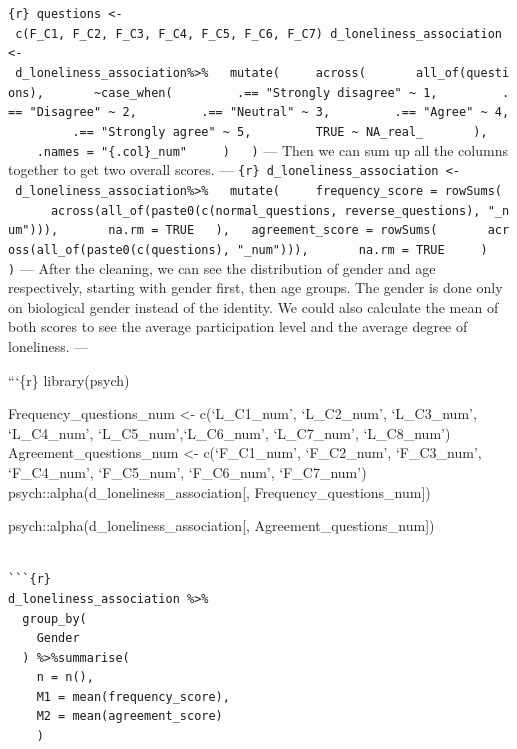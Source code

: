 \documentclass[
]{article}
\begin{document}
\texttt{\{r\}\ questions\ \textless{}-\ c(\textquotesingle{}F\_C1\textquotesingle{},\ \textquotesingle{}F\_C2\textquotesingle{},\ \textquotesingle{}F\_C3\textquotesingle{},\ \textquotesingle{}F\_C4\textquotesingle{},\ \textquotesingle{}F\_C5\textquotesingle{},\ \textquotesingle{}F\_C6\textquotesingle{},\ \textquotesingle{}F\_C7\textquotesingle{})\ d\_loneliness\_association\ \textless{}-\ d\_loneliness\_association\%\textgreater{}\%\ \ \ mutate(\ \ \ \ \ across(\ \ \ \ \ \ \ all\_of(questions),\ \ \ \ \ \ \ \textasciitilde{}case\_when(\ \ \ \ \ \ \ \ \ .==\ "Strongly\ disagree"\ \textasciitilde{}\ 1,\ \ \ \ \ \ \ \ \ .==\ "Disagree"\ \textasciitilde{}\ 2,\ \ \ \ \ \ \ \ \ .==\ "Neutral"\ \textasciitilde{}\ 3,\ \ \ \ \ \ \ \ \ .==\ "Agree"\ \textasciitilde{}\ 4,\ \ \ \ \ \ \ \ \ .==\ "Strongly\ agree"\ \textasciitilde{}\ 5,\ \ \ \ \ \ \ \ \ TRUE\ \textasciitilde{}\ NA\_real\_\ \ \ \ \ \ \ ),\ \ \ \ \ \ \ .names\ =\ "\{.col\}\_num"\ \ \ \ \ )\ \ \ )}
--- Then we can sum up all the columns together to get two overall
scores. ---
\texttt{\{r\}\ d\_loneliness\_association\ \textless{}-\ d\_loneliness\_association\%\textgreater{}\%\ \ \ mutate(\ \ \ \ \ frequency\_score\ =\ rowSums(\ \ \ \ \ \ \ across(all\_of(paste0(c(normal\_questions,\ reverse\_questions),\ "\_num"))),\ \ \ \ \ \ \ na.rm\ =\ TRUE\ \ \ ),\ \ \ agreement\_score\ =\ rowSums(\ \ \ \ \ \ \ across(all\_of(paste0(c(questions),\ "\_num"))),\ \ \ \ \ \ \ na.rm\ =\ TRUE\ \ \ \ \ )\ \ \ )}
--- After the cleaning, we can see the distribution of gender and age
respectively, starting with gender first, then age groups. The gender is
done only on biological gender instead of the identity. We could also
calculate the mean of both scores to see the average participation level
and the average degree of loneliness. ---

```\{r\} library(psych)

Frequency\_questions\_num \textless- c(`L\_C1\_num', `L\_C2\_num',
`L\_C3\_num', `L\_C4\_num', `L\_C5\_num',`L\_C6\_num', `L\_C7\_num',
`L\_C8\_num') Agreement\_questions\_num \textless- c(`F\_C1\_num',
`F\_C2\_num', `F\_C3\_num', `F\_C4\_num', `F\_C5\_num', `F\_C6\_num',
`F\_C7\_num') psych::alpha(d\_loneliness\_association{[},
Frequency\_questions\_num{]})

psych::alpha(d\_loneliness\_association{[},
Agreement\_questions\_num{]})

\begin{verbatim}

```{r}
d_loneliness_association %>%
  group_by(
    Gender
  ) %>%summarise(
    n = n(),
    M1 = mean(frequency_score),
    M2 = mean(agreement_score)
    )
\end{verbatim}
\end{document}
